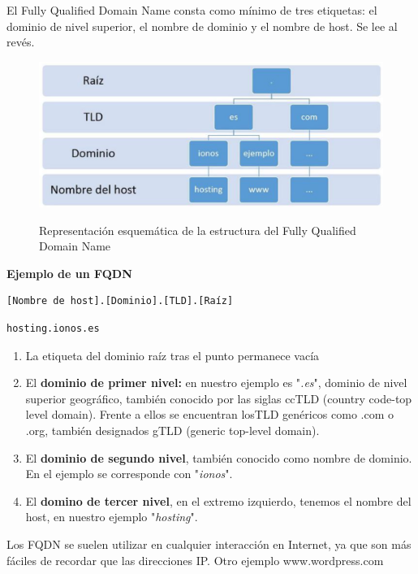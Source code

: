 \documentclass{article}
\begin{document}
El Fully Qualified Domain Name consta como mínimo de tres etiquetas: el dominio de nivel superior, el nombre de dominio y el nombre de host. Se lee al revés.

\begin{figure}[H]
    \centering
    \includegraphics[scale=0.4]{pictures/image11.PNG}
    \label{FQDN Image}
    \caption{Representación esquemática de la estructura del Fully Qualified Domain Name}
\end{figure}

\textbf{Ejemplo de un FQDN}
\begin{verbatim}
[Nombre de host].[Dominio].[TLD].[Raíz]
\end{verbatim}
\begin{verbatim}
hosting.ionos.es
\end{verbatim}
\begin{enumerate}
    \item La etiqueta del dominio raíz tras el punto permanece vacía
    \item El \textbf{dominio de primer nivel:} en nuestro ejemplo es "\textit{.es}", dominio de nivel superior geográfico, también conocido por las siglas ccTLD (country code-top level domain). Frente a ellos se encuentran losTLD genéricos como .com o .org, también designados gTLD (generic top-level domain).
    \item El \textbf{dominio de segundo nivel}, también conocido como nombre de dominio.  En el ejemplo se corresponde con "\textit{ionos}".
    \item El \textbf{domino de tercer nivel}, en el extremo izquierdo, tenemos el nombre del host, en nuestro ejemplo "\textit{hosting}".
    
\end{enumerate}

Los FQDN se suelen utilizar en cualquier interacción en Internet, ya que son más fáciles de recordar que las direcciones IP. Otro ejemplo www.wordpress.com
\end{document}
